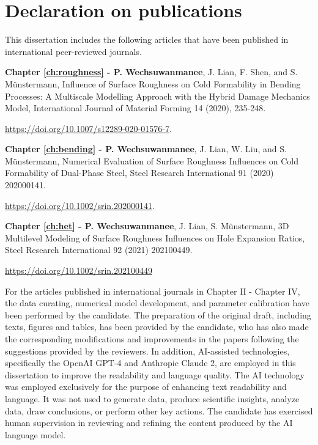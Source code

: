 \chapter*{Declaration on publications}

This dissertation includes the following articles that have been published in international peer-reviewed journals.

\vspace{20pt}

\textbf{Chapter \ref{ch:roughness} - P. Wechsuwanmanee}, J. Lian, F. Shen, and S. Münstermann, Influence of Surface Roughness on Cold Formability in Bending Processes: A Multiscale Modelling Approach with the Hybrid Damage Mechanics Model, International Journal of Material Forming 14 (2020), 235-248.

\vspace{5pt}

\noindent \url{https://doi.org/10.1007/s12289-020-01576-7}.

\vspace{20pt}

\textbf{Chapter \ref{ch:bending} - P. Wechsuwanmanee}, J. Lian, W. Liu, and S. Münstermann, Numerical Evaluation of Surface Roughness Influences on Cold Formability of Dual-Phase Steel, Steel Research International 91 (2020) 202000141.

\vspace{5pt}

\noindent \url{https://doi.org/10.1002/srin.202000141}.

\vspace{20pt}

\textbf{Chapter \ref{ch:het} - P. Wechsuwanmanee}, J. Lian, S. Münstermann, 3D Multilevel Modeling of Surface Roughness Influences on Hole Expansion Ratios, Steel Research International 92 (2021) 202100449.

\vspace{5pt}

\noindent \url{https://doi.org/10.1002/srin.202100449}

\vspace{20pt}

For the articles published in international journals in Chapter II - Chapter IV, the data curating, numerical model development, and parameter calibration have been performed by the candidate. The preparation of the original draft, including texts, figures and tables, has been provided by the candidate, who has also made the corresponding modifications and improvements in the papers following the suggestions provided by the reviewers.
In addition, AI-assisted technologies, specifically the OpenAI GPT-4 and Anthropic Claude 2, are employed in this dissertation to improve the readability and language quality. The AI technology was employed exclusively for the purpose of enhancing text readability and language. It was not used to generate data, produce scientific insights, analyze data, draw conclusions, or perform other key actions. The candidate has exercised human supervision in reviewing and refining the content produced by the AI language model.